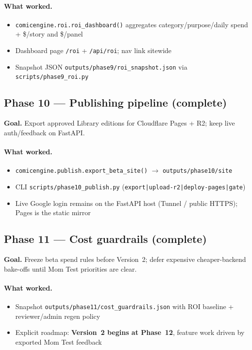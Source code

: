 \documentclass[10pt,twocolumn,letterpaper]{article}
\begin{document}
\paragraph{What worked.}
\begin{itemize}[leftmargin=*,itemsep=1pt]
  \item \texttt{comicengine.roi.roi\_dashboard()} aggregates category/purpose/daily spend + \$/story and \$/panel
  \item Dashboard page \texttt{/roi} + \texttt{/api/roi}; nav link sitewide
  \item Snapshot JSON \texttt{outputs/phase9/roi\_snapshot.json} via \texttt{scripts/phase9\_roi.py}
\end{itemize}

\subsection{Phase 10 --- Publishing pipeline (complete)}
\textbf{Goal.} Export approved Library editions for Cloudflare Pages + R2; keep live auth/feedback on FastAPI.

\paragraph{What worked.}
\begin{itemize}[leftmargin=*,itemsep=1pt]
  \item \texttt{comicengine.publish.export\_beta\_site()} $\rightarrow$ \texttt{outputs/phase10/site}
  \item CLI \texttt{scripts/phase10\_publish.py} (\texttt{export|upload-r2|deploy-pages|gate})
  \item Live Google login remains on the FastAPI host (Tunnel / public HTTPS); Pages is the static mirror
\end{itemize}

\subsection{Phase 11 --- Cost guardrails (complete)}
\textbf{Goal.} Freeze beta spend rules before Version~2; defer expensive cheaper-backend bake-offs until Mom Test priorities are clear.

\paragraph{What worked.}
\begin{itemize}[leftmargin=*,itemsep=1pt]
  \item Snapshot \texttt{outputs/phase11/cost\_guardrails.json} with ROI baseline + reviewer/admin regen policy
  \item Explicit roadmap: \textbf{Version~2 begins at Phase~12}, feature work driven by exported Mom Test feedback
\end{itemize}
\end{document}

